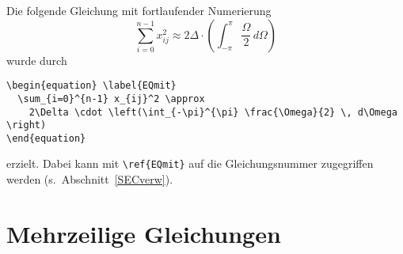 Die folgende Gleichung mit fortlaufender Numerierung
%
\begin{equation} \label{EQmit}
  \sum_{i=0}^{n-1} x_{ij}^2 \approx 
    2\Delta \cdot \left(\int_{-\pi}^{\pi} \frac{\Omega}{2} \, d\Omega \right)
\end{equation}
%
wurde durch 
%
\begin{verbatim}
\begin{equation} \label{EQmit}
  \sum_{i=0}^{n-1} x_{ij}^2 \approx 
    2\Delta \cdot \left(\int_{-\pi}^{\pi} \frac{\Omega}{2} \, d\Omega \right)
\end{equation}
\end{verbatim}
%
erzielt. Dabei kann mit \verb+\ref{EQmit}+ auf die Gleichungsnummer zugegriffen
werden (s.~Abschnitt~\ref{SECverw}).

\section{Mehrzeilige Gleichungen} \label{SECmehrg}


